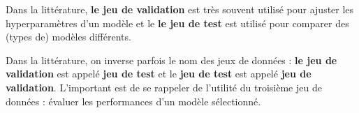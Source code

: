 \documentclass[10pt]{beamer}
\begin{document}
\begin{frame}
	
	\begin{minipage}[c][4cm][t]{0.17\textwidth}
	\end{minipage}
	\begin{minipage}[c][4cm][t]{0.81\textwidth}
		Dans la littérature, \textbf{le jeu de validation} est très souvent utilisé pour ajuster les hyperparamètres d'un modèle et le \textbf{le jeu de test} est utilisé pour comparer des (types de) modèles différents.
	\end{minipage}
	
		\begin{minipage}[c][2cm][t]{0.17\textwidth}
	\end{minipage}
	\begin{minipage}[c][2cm][t]{0.81\textwidth}
		Dans la littérature, on inverse parfois le nom des jeux de données : \textbf{le jeu de validation} est appelé \textbf{jeu de test} et le \textbf{jeu de test} est appelé \textbf{jeu de validation}. L'important est de se rappeler de l'utilité du troisième jeu de données : évaluer les performances d'un modèle sélectionné.
	\end{minipage}
\end{frame}



\end{document}
